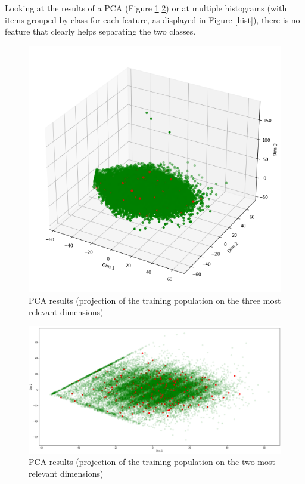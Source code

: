 Looking at the results of a PCA (Figure \ref{pca3} \ref{pca2}) or at multiple histograms (with items grouped by class for each feature, as displayed in Figure \ref{hist}), there is no feature that clearly helps separating the two classes.

\begin{figure}
    \center
    \includegraphics[scale=.38]{img/pca_3D.png}
    \caption{PCA results (projection of the training population on the three most relevant dimensions)}
    \label{pca3}
\end{figure}

\begin{figure}
    \center
    \includegraphics[scale=.38]{img/pca_2D.png}
    \caption{PCA results (projection of the training population on the two most relevant dimensions)}
    \label{pca2}
\end{figure}

